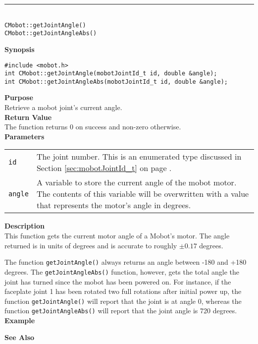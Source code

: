 \noindent
\vspace{5pt}
\rule{4.5in}{0.015in}\\
\noindent
{\LARGE \texttt{CMobot::getJointAngle()}}\\
{\LARGE \texttt{CMobot::getJointAngleAbs()}}\\
{}

\noindent
{\bf Synopsis}
\vspace{-8pt}
\begin{verbatim}
#include <mobot.h>
int CMobot::getJointAngle(mobotJointId_t id, double &angle);
int CMobot::getJointAngleAbs(mobotJointId_t id, double &angle);
\end{verbatim}

\noindent
{\bf Purpose}\\
Retrieve a mobot joint's current angle.\\

\noindent
{\bf Return Value}\\
The function returns 0 on success and non-zero otherwise.\\

\noindent
{\bf Parameters}\\
\vspace{-0.1in}
\begin{description}
\item               
\begin{tabular}{p{15 mm}p{145 mm}}
\texttt{id} & The joint number. This is an enumerated type 
discussed in Section \ref{sec:mobotJointId_t} on page
\pageref{sec:mobotJointId_t}.\\
\texttt{angle} & A variable to store the current angle of the mobot
motor. The contents of this variable will be overwritten with a value that
represents the motor's angle in degrees.  \\
\end{tabular}
\end{description}

\noindent
{\bf Description}\\
This function gets the current motor angle of a Mobot's motor. The
angle returned is in units of degrees and is accurate to roughly $\pm0.17$
degrees. 

The function \texttt{getJointAngle()} always returns an angle between -180 and
+180 degrees. The \texttt{getJointAngleAbs()} function, however, gets the total
angle the joint has turned since the mobot has been powered on. For instance, 
if the faceplate joint 1 has been rotated two full rotations after initial power up,
  the function \texttt{getJointAngle()} will report that the joint is at angle 0,
  whereas the function \texttt{getJointAngleAbs()} will report that the joint
  angle is 720 degrees.
\\

\noindent
{\bf Example}\\
\noindent

\noindent
{\bf See Also}\\


